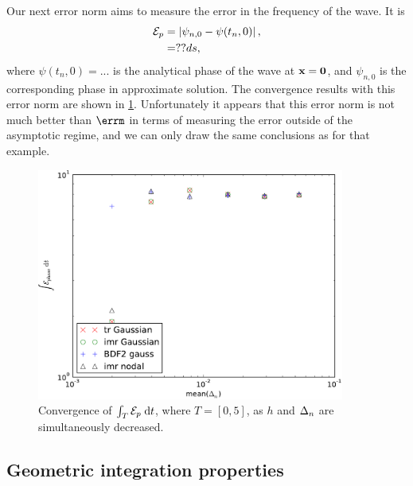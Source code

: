 Our next error norm aims to measure the error in the frequency of the wave.
It is
\begin{equation}
  \begin{aligned}
    \mathcal{E}_p &= \left|{\psi_{n,0} - \psi(t_n, 0)} \right|, \\
    &= ??ds,
  \end{aligned}
\end{equation}
where $\psi(t_n, 0) = ...$ is the analytical phase of the wave at $\boldsymbol{\mathrm{x}} = \mathbf{0}$, and $\psi_{n,0}$ is the corresponding phase in approximate solution.
The convergence results with this error norm are shown in \cref{fig:convergence-long-time-phase-norm}.
Unfortunately it appears that this error norm is not much better than $\errm$ in terms of measuring the error outside of the asymptotic regime, and we can only draw the same conclusions as for that example.
\begin{figure}
  \centering
  \includegraphics[width=0.9\textwidth]{plots/2d_wave_solution_convergence_long_time/auxerr0integralvsmeanofdts.pdf}
  \caption{Convergence of ${\int_T {\mathcal{E}_p} {\; \mathrm{{d}}} t}$, where $T=[0,5]$, as $h$ and $\Delta_{n}$ are simultaneously decreased.}
  \label{fig:convergence-long-time-phase-norm}
\end{figure}



\subsection{Geometric integration properties}
\label{sec:2d-wave-results-cons-prop}

